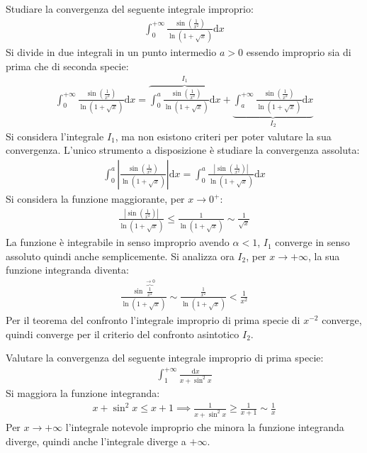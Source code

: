 \documentclass{article}
\newcommand{\df}{\mathrm{d}}
\newcommand{\intab}[4]{\displaystyle\int_{#1}^{#2}{#3}\df{#4}}
\newcommand{\intpinf}[2]{\intab{0}{+\infty}{#1}{#2}}
\numberwithin{equation}{subsection}
\begin{document}
Studiare la convergenza del seguente integrale improprio:
\begin{gather*}
    \intpinf{\frac{\sin\left(\frac{1}{x^2}\right)}{\ln\left(1+\sqrt{x}\right)}}{x}
\end{gather*}
Si divide in due integrali in un punto intermedio $a>0$ essendo improprio sia di prima che di seconda specie:
\begin{gather*}
    \intpinf{\frac{\sin\left(\frac{1}{x^2}\right)}{\ln\left(1+\sqrt{x}\right)}}{x}=
    \overbrace{\int_0^a\frac{\sin\left(\frac{1}{x^2}\right)}{\ln\left(1+\sqrt{x}\right)}\df x}^{I_1}+
    \underbrace{\int_a^{+\infty}\frac{\sin\left(\frac{1}{x^2}\right)}{\ln\left(1+\sqrt{x}\right)}\df x}_{I_2}
\end{gather*}
Si considera l'integrale $I_1$, ma non esistono criteri per poter valutare la sua convergenza. L'unico strumento a disposizione è studiare la convergenza assoluta:
\begin{gather*}
    \displaystyle\int_0^a\left|\frac{\sin\left(\frac{1}{x^2}\right)}{\ln\left(1+\sqrt{x}\right)}\right|\df x=\int_0^a\frac{\left|\sin\left(\frac{1}{x^2}\right)\right|}{\ln\left(1+\sqrt{x}\right)}\df x
\end{gather*}
Si considera la funzione maggiorante, per $x\to0^+$:
\begin{gather*}
    \frac{|\sin\left(\frac{1}{x^2}\right)|}{\ln\left(1+\sqrt{x}\right)}\leq\frac{1}{\ln(1+\sqrt{x})}\sim\frac{1}{\sqrt{x}}
\end{gather*}
La funzione è integrabile in senso improprio avendo $\alpha<1$, $I_1$ converge in senso assoluto quindi anche semplicemente. Si analizza ora $I_2$, per $x\to+\infty$, la sua funzione integranda diventa:
\begin{gather*}
    \displaystyle\frac{\sin\overbrace{\frac{1}{x^2}}^{\to0}}{\ln\left(1+\sqrt{x}\right)}\sim
    \frac{\frac{1}{x^2}}{\ln\left(1+\sqrt{x}\right)}<\frac{1}{x^2}
\end{gather*}
Per il teorema del confronto l'integrale improprio di prima specie di $x^{-2}$ converge, quindi converge per il criterio del confronto asintotico $I_2$. 



Valutare la convergenza del seguente integrale improprio di prima specie:
\begin{gather*}
    \displaystyle\int_1^{+\infty}\frac{\df x}{x+\sin^2x}
\end{gather*}
Si maggiora la funzione integranda:
\begin{gather*}
    x+\sin^2x\leq x+1\implies\displaystyle\frac{1}{x+\sin^2x}\geq\frac{1}{x+1}\sim\frac{1}{x}
\end{gather*}
Per $x\to+\infty$ l'integrale notevole improprio che minora la funzione integranda diverge, quindi anche l'integrale diverge a $+\infty$. 
\end{document}
